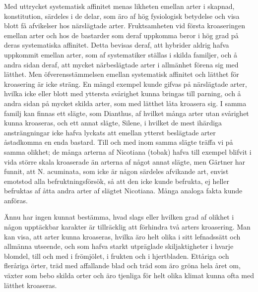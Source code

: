 Med uttrycket systematisk affinitet menas likheten emellan arter i skapnad, konstitution, särdeles i de delar, som äro af hög fysiologisk betydelse och visa blott få afvikelser hos närslägtade arter. Fruktsamheten vid första kroaseringen emellan arter och hos de bastarder som deraf uppkomma beror i hög grad på deras systematiska affinitet. Detta bevisas deraf, att hybrider aldrig hafva uppkommit emellan arter, som af systematiker ställas i skilda familjer, och å andra sidan deraf, att mycket närbeslägtade arter i allmänhet förena sig med lätthet. Men öfverensstämmelsen emellan systematisk affinitet och lätthet för kroasering är icke sträng. En mängd exempel kunde gifvas på närslägtade arter, hvilka icke eller blott med yttersta svårighet kunna bringas till parning, och å andra sidan på mycket skilda arter, som med lätthet låta kroasera sig. I samma familj kan finnas ett slägte, som Dianthus, af hvilket många arter utan svårighet kunna kroaseras, och ett annat slägte, Silene, i hvilket de mest ihärdiga ansträngningar icke hafva lyckats att emellan ytterst beslägtade arter åstadkomma en enda bastard. Till och med inom samma slägte träffa vi på samma olikhet; de många arterna af Nicotiana (tobak) hafva till exempel blifvit i vida större skala kroaserade än arterna af något annat slägte, men Gärtner har funnit, att N. acuminata, som icke är någon särdeles afvikande art, envist emotstod alla befruktningsförsök, så att den icke kunde befrukta, ej heller befruktas af åtta andra arter af slägtet Nicotiana. Många analoga fakta kunde anföras.

Ännu har ingen kunnat bestämma, hvad slags eller hvilken grad af olikhet i någon upptäckbar karakter är tillräcklig att förhindra två arters kroasering. Man kan visa, att arter kunna kroaseras, hvilka äro helt olika i sitt lefnadssätt och allmänna utseende, och som hafva starkt utpräglade skiljaktigheter i hvarje blomdel, till och med i frömjölet, i frukten och i hjertbladen. Ettåriga och fleråriga örter, träd med affallande blad och träd som äro gröna hela året om, växter som bebo skilda orter och äro tjenliga för helt olika klimat kunna ofta med lätthet kroaseras.

